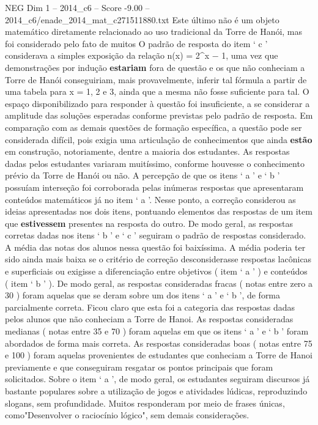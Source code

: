 \begin{textsample}{NEG Dim 1 – 2014\_c6 – Score -9.00 – 2014\_c6/enade\_2014\_mat\_c271511880.txt}
Este último não é um objeto matemático diretamente relacionado ao uso tradicional da Torre de Hanói, mas foi considerado pelo fato de muitos O padrão de resposta do item ‘ c ’ considerava a simples exposição da relação n(x) = 2\textasciicircum{}x − 1, uma vez que demonstrações por indução \textbf{estariam} fora de questão e os que não conheciam a Torre de Hanói conseguiriam, mais provavelmente, inferir tal fórmula a partir de uma tabela para x = 1, 2 e 3, ainda que a mesma não fosse suficiente para tal.
O espaço disponibilizado para responder à questão foi insuficiente, a se considerar a amplitude das soluções esperadas conforme previstas pelo padrão de resposta.
Em comparação com as demais questões de formação específica, a questão pode ser considerada difícil, pois exigia uma articulação de conhecimentos que ainda \textbf{estão} em construção, notoriamente, dentre a maioria dos estudantes.
As respostas dadas pelos estudantes variaram muitíssimo, conforme houvesse o conhecimento prévio da Torre de Hanói ou não.
A percepção de que os itens ‘ a ’ e ‘ b ’ possuíam interseção foi corroborada pelas inúmeras respostas que apresentaram conteúdos matemáticos já no item ‘ a ’.
Nesse ponto, a correção considerou as ideias apresentadas nos dois itens, pontuando elementos das respostas de um item que \textbf{estivessem} presentes na resposta do outro.
De modo geral, as respostas corretas dadas nos itens ‘ b ’ e ‘ c ’ seguiram o padrão de respostas considerado.
A média das notas dos alunos nessa questão foi baixíssima.
A média poderia ter sido ainda mais baixa se o critério de correção desconsiderasse respostas lacônicas e superficiais ou exigisse a diferenciação entre objetivos ( item ‘ a ’ ) e conteúdos ( item ‘ b ’ ).
De modo geral, as respostas consideradas fracas ( notas entre zero a 30 ) foram aquelas que se deram sobre um dos itens ‘ a ’ e ‘ b ’, de forma parcialmente correta.
Ficou claro que esta foi a categoria das respostas dadas pelos alunos que não conheciam a Torre de Hanoi.
As respostas consideradas medianas ( notas entre 35 e 70 ) foram aquelas em que os itens ‘ a ’ e ‘ b ’ foram abordados de forma mais correta.
As respostas consideradas boas ( notas entre 75 e 100 ) foram aquelas provenientes de estudantes que conheciam a Torre de Hanoi previamente e que conseguiram resgatar os pontos principais que foram solicitados.
Sobre o item ‘ a ’, de modo geral, os estudantes seguiram discursos já bastante populares sobre a utilização de jogos e atividades lúdicas, reproduzindo slogans, sem profundidade.
Muitos responderam por meio de frases únicas, como"Desenvolver o raciocínio lógico", sem demais considerações.

\end{textsample}
